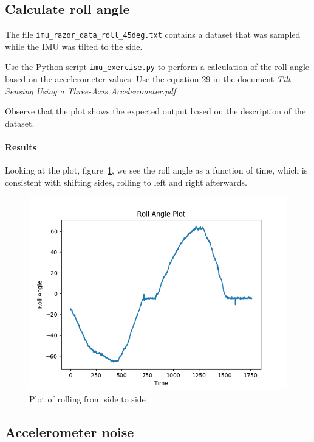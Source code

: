 \documentclass[paper=letter, fontsize=10pt]{article}
\begin{document}
\subsection{Calculate roll angle}
The file \texttt{imu\_razor\_data\_roll\_45deg.txt} contains a dataset that was sampled while the IMU was tilted to the side.

Use the Python script \texttt{imu\_exercise.py} to perform a calculation of the roll angle based on the accelerometer values. Use the equation 29 in the document \textit{Tilt Sensing Using a Three-Axis Accelerometer.pdf}

Observe that the plot shows the expected output based on the description of the dataset.


\paragraph{Results}
Looking at the plot, figure~\ref{fig:ex1_roll_plot}, we see the roll angle as a function of time, which is consistent with shifting sides, rolling to left and right afterwards.

\begin{figure}[h!]
\centering
\includegraphics[scale=.65]{Figures/ex1_roll_angle}
\caption{Plot of rolling from side to side}
\label{fig:ex1_roll_plot}
\end{figure}

\subsection{Accelerometer noise}
\end{document}
